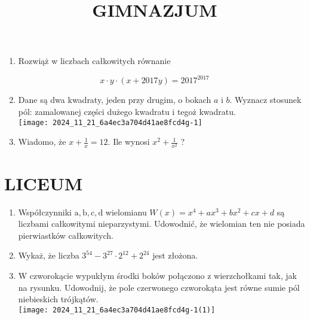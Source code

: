 \documentclass[10pt]{article}
\title{GIMNAZJUM }
\author{}
\date{}
\begin{document}
\maketitle
\begin{enumerate}
  \item Rozwiąż w liczbach całkowitych równanie
\end{enumerate}

\[
x \cdot y \cdot(x+2017 y)=2017^{2017}
\]

\begin{enumerate}
  \setcounter{enumi}{1}
  \item Dane są dwa kwadraty, jeden przy drugim, o bokach \(a\) i \(b\). Wyznacz stosunek pól: zamalowanej części dużego kwadratu i tegoż kwadratu.\\
\texttt{[image: 2024\_11\_21\_6a4ec3a704d41ae8fcd4g-1]}
  \item Wiadomo, że \(x+\frac{1}{x}=12\). Ile wynosi \(x^{2}+\frac{1}{x^{2}}\) ?
\end{enumerate}

\section*{LICEUM}
\begin{enumerate}
  \item Współczynniki \(\mathrm{a}, \mathrm{b}, \mathrm{c}, \mathrm{d}\) wielomianu \(W(x)=x^{4}+a x^{3}+b x^{2}+c x+d\) są liczbami całkowitymi nieparzystymi. Udowodnić, że wielomian ten nie posiada pierwiastków całkowitych.
  \item Wykaż, że liczba \(3^{54}-3^{27} \cdot 2^{12}+2^{24}\) jest złożona.
  \item W czworokącie wypukłym środki boków połączono z wierzchołkami tak, jak na rysunku. Udowodnij, że pole czerwonego czworokąta jest równe sumie pól niebieskich trójkątów.\\
\texttt{[image: 2024\_11\_21\_6a4ec3a704d41ae8fcd4g-1(1)]}
\end{enumerate}
\end{document}
